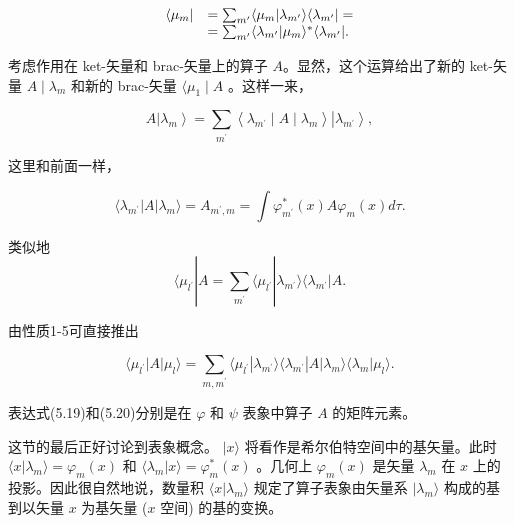 \begin{equation*}
\begin{array}{r l} \langle \mu_ {m} | & = \sum_ {m ^ {\prime}} \langle \mu_ {m} | \lambda_ {m ^ {\prime}} \rangle \langle \lambda_ {m ^ {\prime}} | = \\ & = \sum_ {m ^ {\prime}} \langle \lambda_ {m ^ {\prime}} | \mu_ {m} \rangle^ {*} \langle \lambda_ {m ^ {\prime}} |. \end{array}
\end{equation*}

考虑作用在 ket-矢量和 brac-矢量上的算子 $A$。显然，这个运算给出了新的 ket-矢量 $A \mid \lambda_{m}$ 和新的 brac-矢量 $\langle \mu_{1} \mid A$ 。这样一来，

\begin{equation*}
A \left| \lambda_ {m} \right\rangle = \sum_ {m ^ {\prime}} \left\langle \lambda_ {m ^ {\prime}} \mid A \mid \lambda_ {m} \right\rangle \left| \lambda_ {m ^ {\prime}} \right\rangle ,
\end{equation*}

这里和前面一样，

\begin{equation*}
\langle \lambda_ {m ^ {\prime}} | A | \lambda_ {m} \rangle = A _ {m ^ {\prime}, m} = \int \varphi_ {m ^ {\prime}} ^ {*} (x) A \varphi_ {m} (x) d \tau .\tag{5.19}
\end{equation*}

类似地
\begin{equation*}
\langle \mu_ {l ^ {\prime}} | A = \sum_ {m ^ {\prime}} \langle \mu_ {l ^ {\prime}} | \lambda_ {m ^ {\prime}} \rangle \langle \lambda_ {m ^ {\prime}} | A.
\end{equation*}

由性质1-5可直接推出

\begin{equation*}
\langle \mu_ {l ^ {\prime}} | A | \mu_ {l} \rangle = \sum_ {m, m ^ {\prime}} \langle \mu_ {l ^ {\prime}} | \lambda_ {m ^ {\prime}} \rangle \langle \lambda_ {m ^ {\prime}} | A | \lambda_ {m} \rangle \langle \lambda_ {m} | \mu_ {l} \rangle .\tag{5.20}
\end{equation*}

表达式(5.19)和(5.20)分别是在 $\varphi$ 和 $\psi$ 表象中算子 $A$ 的矩阵元素。

这节的最后正好讨论到表象概念。 $|x\rangle$ 将看作是希尔伯特空间中的基矢量。此时 $\langle x|\lambda_{m}\rangle=\varphi_{m}(x)$ 和 $\langle\lambda_{m}|x\rangle=\varphi_{m}^{*}(x)$ 。几何上 $\varphi_{m}(x)$ 是矢量 $\lambda_{m}$ 在 $x$ 上的投影。因此很自然地说，数量积 $\langle x|\lambda_{m}\rangle$ 规定了算子表象由矢量系 $|\lambda_{m}\rangle$ 构成的基到以矢量 $x$ 为基矢量 ($x$ 空间) 的基的变换。

